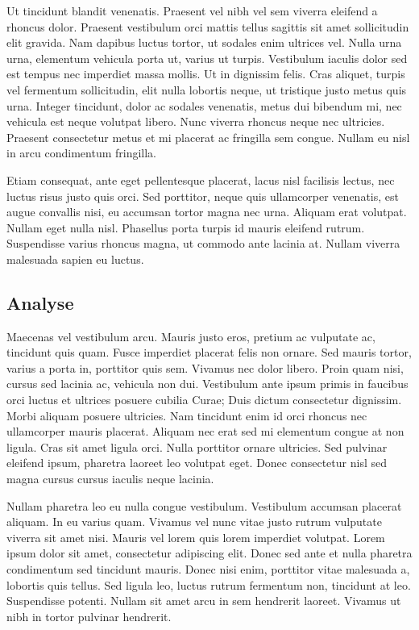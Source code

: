 Ut tincidunt blandit venenatis. Praesent vel nibh vel sem viverra eleifend a rhoncus dolor. Praesent vestibulum orci mattis tellus sagittis sit amet sollicitudin elit gravida. Nam dapibus luctus tortor, ut sodales enim ultrices vel. Nulla urna urna, elementum vehicula porta ut, varius ut turpis. Vestibulum iaculis dolor sed est tempus nec imperdiet massa mollis. Ut in dignissim felis. Cras aliquet, turpis vel fermentum sollicitudin, elit nulla lobortis neque, ut tristique justo metus quis urna. Integer tincidunt, dolor ac sodales venenatis, metus dui bibendum mi, nec vehicula est neque volutpat libero. Nunc viverra rhoncus neque nec ultricies. Praesent consectetur metus et mi placerat ac fringilla sem congue. Nullam eu nisl in arcu condimentum fringilla. 

Etiam consequat, ante eget pellentesque placerat, lacus nisl facilisis lectus, nec luctus risus justo quis orci. Sed porttitor, neque quis ullamcorper venenatis, est augue convallis nisi, eu accumsan tortor magna nec urna. Aliquam erat volutpat. Nullam eget nulla nisl. Phasellus porta turpis id mauris eleifend rutrum. Suspendisse varius rhoncus magna, ut commodo ante lacinia at. Nullam viverra malesuada sapien eu luctus. 

\subsection{Analyse}

Maecenas vel vestibulum arcu. Mauris justo eros, pretium ac vulputate ac, tincidunt quis quam. Fusce imperdiet placerat felis non ornare. Sed mauris tortor, varius a porta in, porttitor quis sem. Vivamus nec dolor libero. Proin quam nisi, cursus sed lacinia ac, vehicula non dui. Vestibulum ante ipsum primis in faucibus orci luctus et ultrices posuere cubilia Curae; Duis dictum consectetur dignissim. Morbi aliquam posuere ultricies. Nam tincidunt enim id orci rhoncus nec ullamcorper mauris placerat. Aliquam nec erat sed mi elementum congue at non ligula. Cras sit amet ligula orci. Nulla porttitor ornare ultricies. Sed pulvinar eleifend ipsum, pharetra laoreet leo volutpat eget. Donec consectetur nisl sed magna cursus cursus iaculis neque lacinia. 

Nullam pharetra leo eu nulla congue vestibulum. Vestibulum accumsan placerat aliquam. In eu varius quam. Vivamus vel nunc vitae justo rutrum vulputate viverra sit amet nisi. Mauris vel lorem quis lorem imperdiet volutpat. Lorem ipsum dolor sit amet, consectetur adipiscing elit. Donec sed ante et nulla pharetra condimentum sed tincidunt mauris. Donec nisi enim, porttitor vitae malesuada a, lobortis quis tellus. Sed ligula leo, luctus rutrum fermentum non, tincidunt at leo. Suspendisse potenti. Nullam sit amet arcu in sem hendrerit laoreet. Vivamus ut nibh in tortor pulvinar hendrerit. 

